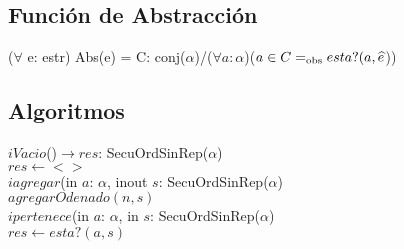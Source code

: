 \subsection*{Funci\'on de Abstracci\'on}
\vspace{11pt}
($\forall$ e: estr) Abs(e) = C: conj($\alpha$)/($\forall a:\alpha$)($a\in C=_{\mathrm{obs}} esta?(a,\widehat{e}$))
\vspace{33pt}


\subsection*{Algoritmos}

$iVacio$()$\longrightarrow res$: SecuOrdSinRep($\alpha$)\\
$res\longleftarrow <>$\\

$iagregar$(in $a$: $\alpha$, inout $s$: SecuOrdSinRep($\alpha$)\\
$agregarOdenado(n,s)$\\

$ipertenece$(in $a$: $\alpha$, in $s$: SecuOrdSinRep($\alpha$)\\
$res\longleftarrow esta?(a,s)$\\